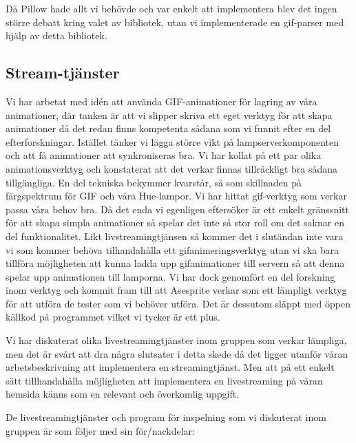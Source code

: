 \documentclass[a4paper,11pt]{article}
\begin{document}
   Då Pillow hade allt vi behövde och var enkelt att implementera blev det
   ingen större debatt kring valet av bibliotek, utan vi implementerade en 
   gif-parser med hjälp av detta bibliotek.


\subsection{Stream-tjänster}

  Vi har arbetat med idén att använda GIF-animationer för lagring av våra
  animationer, där tanken är att vi slipper skriva ett eget verktyg för att
  skapa animationer då det redan finns kompetenta sådana som vi funnit efter 
  en del efterforskningar.  Istället tänker vi lägga större vikt på 
  lampserverkomponenten och att få animationer att synkroniseras bra.  Vi har
  kollat på ett par olika animationsverktyg och konstaterat att det verkar
  finnas tillräckligt bra sådana tillgängliga. En del tekniska bekymmer 
  kvarstår, så som skillnaden på färgspektrum för GIF och våra Hue-lampor.
  Vi har hittat gif-verktyg som verkar passa våra behov bra. Då det enda vi
  egenligen eftersöker är ett enkelt gränssnitt för att skapa simpla 
  animationer så spelar det inte så stor roll om det saknar en del 
  funktionalitet. Likt livstreamingtjänsen så kommer det i slutändan inte 
  vara vi som kommer behöva tilhandahålla ett gifanimeringsverktyg utan vi 
  ska bara tillföra möjligheten att kunna ladda upp gifanimationer till 
  servern så att denna spelar upp animationen till lamporna. Vi har dock 
  genomfört en del forskning inom verktyg och kommit fram till att Asesprite 
  verkar som ett lämpligt verktyg för att utföra de tester som vi behöver 
  utföra. Det är dessutom släppt med öppen källkod på programmet vilket vi 
  tycker är ett plus.

  Vi har diskuterat olika livestreamingtjänster inom gruppen som verkar 
  lämpliga, men det är svårt att dra några slutsater i detta skede då det 
  ligger utanför våran arbetsbeskrivning att implementera en streamingtjänst.
  Men att på ett enkelt sätt tillhandahålla möjligheten att implementera en 
  livestreaming på våran hemsida känns som en relevant och överkomlig uppgift.

  De livestreamingtjänster och program för inspelning som vi diskuterat inom 
  gruppen är som följer med sin för/nackdelar:
\end{document}
